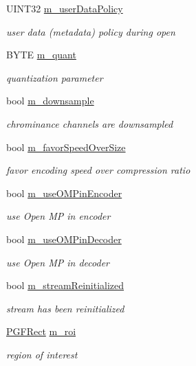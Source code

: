 \begin{DoxyCompactItemize}
U\+I\+N\+T32 \mbox{\hyperlink{classCPGFImage_a18e28eef51d17c3bd0be4d4f758a6a86}{m\+\_\+user\+Data\+Policy}}
\begin{DoxyCompactList}\small\item\em user data (metadata) policy during open \end{DoxyCompactList}\item 
B\+Y\+TE \mbox{\hyperlink{classCPGFImage_a57cc024db6e510f95f3238f448a0fed5}{m\+\_\+quant}}
\begin{DoxyCompactList}\small\item\em quantization parameter \end{DoxyCompactList}\item 
bool \mbox{\hyperlink{classCPGFImage_a9226595ea6b907e4d07301a6ee641b87}{m\+\_\+downsample}}
\begin{DoxyCompactList}\small\item\em chrominance channels are downsampled \end{DoxyCompactList}\item 
bool \mbox{\hyperlink{classCPGFImage_a6925d3950e8f48487205d46de7920d3e}{m\+\_\+favor\+Speed\+Over\+Size}}
\begin{DoxyCompactList}\small\item\em favor encoding speed over compression ratio \end{DoxyCompactList}\item 
bool \mbox{\hyperlink{classCPGFImage_a140110570c6d492b23db50189d3f4d48}{m\+\_\+use\+O\+M\+Pin\+Encoder}}
\begin{DoxyCompactList}\small\item\em use Open MP in encoder \end{DoxyCompactList}\item 
bool \mbox{\hyperlink{classCPGFImage_a01d0752d97900040fa1db7f02d4770cb}{m\+\_\+use\+O\+M\+Pin\+Decoder}}
\begin{DoxyCompactList}\small\item\em use Open MP in decoder \end{DoxyCompactList}\item 
bool \mbox{\hyperlink{classCPGFImage_af6d3fe5a8622634d1d0faf56cde335ef}{m\+\_\+stream\+Reinitialized}}
\begin{DoxyCompactList}\small\item\em stream has been reinitialized \end{DoxyCompactList}\item 
\mbox{\hyperlink{structPGFRect}{P\+G\+F\+Rect}} \mbox{\hyperlink{classCPGFImage_a79627ae9b19c69589eaa2ba7711ddd00}{m\+\_\+roi}}
\begin{DoxyCompactList}\small\item\em region of interest \end{DoxyCompactList}\end{DoxyCompactItemize}
